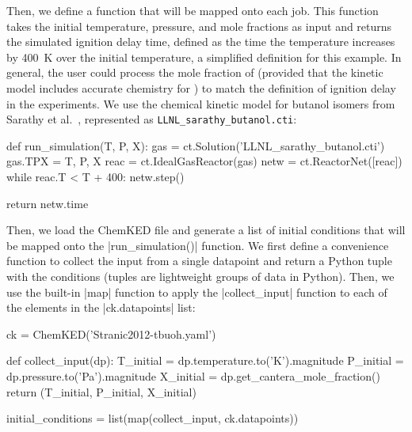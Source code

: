 \documentclass[12pt]{ijck}
\begin{document}
Then, we define a function that will be mapped onto each job. This function takes the initial
temperature, pressure, and mole fractions as input and returns the simulated ignition delay time,
defined as the time the temperature increases by \SI{400}{\K} over the initial temperature, a
simplified definition for this example. In general, the user could process the mole fraction of
 (provided that the kinetic model includes accurate chemistry for ) to match the
definition of ignition delay in the experiments. We use the chemical kinetic model
for butanol isomers from Sarathy et al.~\cite{Sarathy:2012fj}, represented as
\verb|LLNL_sarathy_butanol.cti|:
%
\begin{pythonbox}
def run_simulation(T, P, X):
    gas = ct.Solution('LLNL_sarathy_butanol.cti')
    gas.TPX = T, P, X
    reac = ct.IdealGasReactor(gas)
    netw = ct.ReactorNet([reac])
    while reac.T < T + 400:
        netw.step()

    return netw.time
\end{pythonbox}

Then, we load the ChemKED file and generate a list of initial conditions that will be mapped onto
the \pybox|run_simulation()| function. We first define a convenience function to collect the input
from a single datapoint and return a Python tuple with the conditions (tuples are lightweight groups
of data in Python). Then, we use the built-in \pybox|map| function to apply the
\pybox|collect_input| function to each of the elements in the \pybox|ck.datapoints| list:
%
\begin{pythonbox}
ck = ChemKED('Stranic2012-tbuoh.yaml')

def collect_input(dp):
    T_initial = dp.temperature.to('K').magnitude
    P_initial = dp.pressure.to('Pa').magnitude
    X_initial = dp.get_cantera_mole_fraction()
    return (T_initial, P_initial, X_initial)

initial_conditions = list(map(collect_input, ck.datapoints))
\end{pythonbox}
\end{document}
